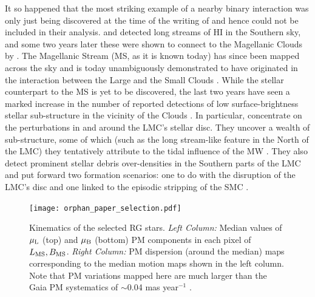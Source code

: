 \documentclass[a4paper,useAMS,usenatbib]{mnras}
\begin{document}
It so happened that the most striking example of a nearby binary
interaction was only just being discovered at the time of the writing
of \citet{Toomre1972} and hence could not be included in their
analysis. \citet{Wannier1972} and \citet{Kuilenburg1972} detected long
streams of HI in the Southern sky, and some two years later these were
shown to connect to the Magellanic Clouds by
\citet{Mathewson1974}. The Magellanic Stream (MS, as it is known
today) has since been mapped across the sky \citep[see
  e.g.][]{Putman2003,Nidever2008,Nidever2010} and is today
unambiguously demonstrated to have originated in the interaction
between the Large and the Small Clouds \citep[LMC and
  SMC,][]{Besla2007, Besla2010, Diaz2011, Diaz2012}. While the stellar
counterpart to the MS is yet to be discovered, the last two years have
seen a marked increase in the number of reported detections of low
surface-brightness stellar sub-structure in the vicinity of the Clouds
\citep[see
  e.g.][]{Mackey2016,Belokurov2016,Belokurov2017,Deason2017,Pieres2017,Mackey2018,Nidever2018}. In
particular, \citet{Mackey2016,Mackey2018} concentrate on the
perturbations in and around the LMC's stellar disc. They uncover a
wealth of sub-structure, some of which (such as the long stream-like
feature in the North of the LMC) they tentatively attribute to the
tidal influence of the MW \citep[][]{Mackey2016}. They also
detect prominent stellar debris over-densities in the Southern parts
of the LMC and put forward two formation scenarios: one to do with the
disruption of the LMC's disc and one linked to the episodic stripping
of the SMC \citep[see also][who argued for the importance of repeated
  interactions with the SMC]{besla_etal_2016}.

%
\begin{figure}
  \centering
  \texttt{[image: orphan\_paper\_selection.pdf]}
  \caption[]{Kinematics of the selected RG stars. {\it Left Column:}
    Median values of $\mu_{\rm L}$ (top) and $\mu_{\rm B}$ (bottom) PM
    components in each pixel of $L_{\rm MS}, B_{\rm MS}$. {\it Right
      Column:} PM dispersion (around the median) maps corresponding to
    the median motion maps shown in the left column. Note that PM
    variations mapped here are much larger than the Gaia PM
    systematics of $\sim$0.04 mas year$^{-1}$ \citep[see][]{Arenou2018}.}
   \label{fig:vel}
\end{figure}
%
\end{document}
